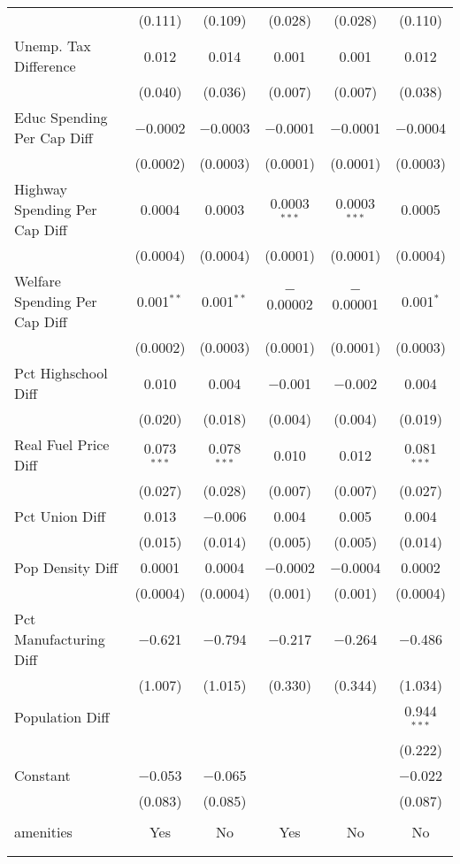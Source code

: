 \begin{table}[!htbp]
\begin{tabular}{@{\extracolsep{5pt}}lccccc}
  & (0.111) & (0.109) & (0.028) & (0.028) & (0.110) \\ 
  Unemp. Tax Difference & 0.012 & 0.014 & 0.001 & 0.001 & 0.012 \\ 
  & (0.040) & (0.036) & (0.007) & (0.007) & (0.038) \\ 
  Educ Spending Per Cap Diff & $-$0.0002 & $-$0.0003 & $-$0.0001 & $-$0.0001 & $-$0.0004 \\ 
  & (0.0002) & (0.0003) & (0.0001) & (0.0001) & (0.0003) \\ 
  Highway Spending Per Cap Diff & 0.0004 & 0.0003 & 0.0003$^{***}$ & 0.0003$^{***}$ & 0.0005 \\ 
  & (0.0004) & (0.0004) & (0.0001) & (0.0001) & (0.0004) \\ 
  Welfare Spending Per Cap Diff & 0.001$^{**}$ & 0.001$^{**}$ & $-$0.00002 & $-$0.00001 & 0.001$^{*}$ \\ 
  & (0.0002) & (0.0003) & (0.0001) & (0.0001) & (0.0003) \\ 
  Pct Highschool Diff & 0.010 & 0.004 & $-$0.001 & $-$0.002 & 0.004 \\ 
  & (0.020) & (0.018) & (0.004) & (0.004) & (0.019) \\ 
  Real Fuel Price Diff & 0.073$^{***}$ & 0.078$^{***}$ & 0.010 & 0.012 & 0.081$^{***}$ \\ 
  & (0.027) & (0.028) & (0.007) & (0.007) & (0.027) \\ 
  Pct Union Diff & 0.013 & $-$0.006 & 0.004 & 0.005 & 0.004 \\ 
  & (0.015) & (0.014) & (0.005) & (0.005) & (0.014) \\ 
  Pop Density Diff & 0.0001 & 0.0004 & $-$0.0002 & $-$0.0004 & 0.0002 \\ 
  & (0.0004) & (0.0004) & (0.001) & (0.001) & (0.0004) \\ 
  Pct Manufacturing Diff & $-$0.621 & $-$0.794 & $-$0.217 & $-$0.264 & $-$0.486 \\ 
  & (1.007) & (1.015) & (0.330) & (0.344) & (1.034) \\ 
  Population Diff &  &  &  &  & 0.944$^{***}$ \\ 
  &  &  &  &  & (0.222) \\ 
  Constant & $-$0.053 & $-$0.065 &  &  & $-$0.022 \\ 
  & (0.083) & (0.085) &  &  & (0.087) \\ 
 \hline \\[-1.8ex] 
amenities & Yes & No & Yes & No & No \\ 
\hline \\[-1.8ex] 
\hline 
\hline \\[-1.8ex] 
\end{tabular} 
\end{table} 
